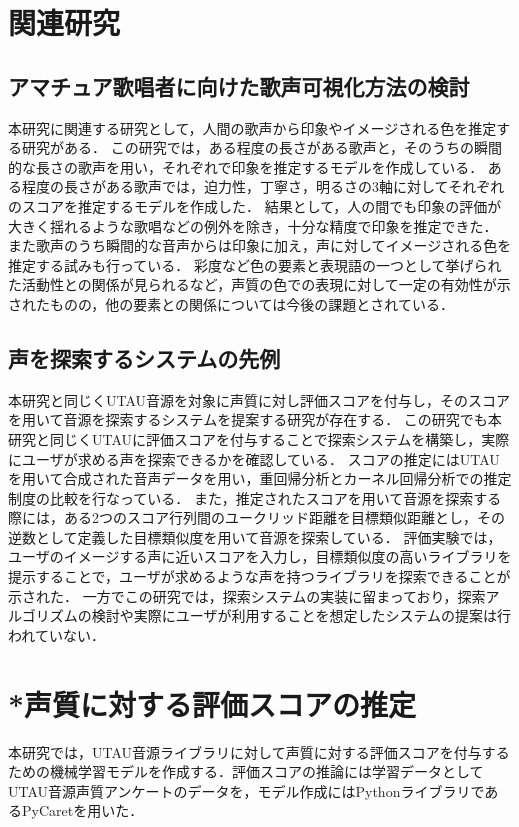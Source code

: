 \documentclass[a4j,8pt,twocolumn]{extarticle}
\begin{document}
\section{関連研究}
\subsection{アマチュア歌唱者に向けた歌声可視化方法の検討}
本研究に関連する研究として，人間の歌声から印象やイメージされる色を推定する研究\cite{}がある．
この研究では，ある程度の長さがある歌声と，そのうちの瞬間的な長さの歌声を用い，それぞれで印象を推定するモデルを作成している．
ある程度の長さがある歌声では，迫力性，丁寧さ，明るさの3軸に対してそれぞれのスコアを推定するモデルを作成した．
結果として，人の間でも印象の評価が大きく揺れるような歌唱などの例外を除き，十分な精度で印象を推定できた．
また歌声のうち瞬間的な音声からは印象に加え，声に対してイメージされる色を推定する試みも行っている．
彩度など色の要素と表現語の一つとして挙げられた活動性との関係が見られるなど，声質の色での表現に対して一定の有効性が示されたものの，他の要素との関係については今後の課題とされている．

\subsection{声を探索するシステムの先例}
本研究と同じくUTAU音源を対象に声質に対し評価スコアを付与し，そのスコアを用いて音源を探索するシステムを提案する研究\cite{}が存在する．
この研究でも本研究と同じくUTAUに評価スコアを付与することで探索システムを構築し，実際にユーザが求める声を探索できるかを確認している．
スコアの推定にはUTAUを用いて合成された音声データを用い，重回帰分析とカーネル回帰分析での推定制度の比較を行なっている．
また，推定されたスコアを用いて音源を探索する際には，ある2つのスコア行列間のユークリッド距離を目標類似距離とし，その逆数として定義した目標類似度を用いて音源を探索している．
評価実験では，ユーザのイメージする声に近いスコアを入力し，目標類似度の高いライブラリを提示することで，ユーザが求めるような声を持つライブラリを探索できることが示された．
一方でこの研究では，探索システムの実装に留まっており，探索アルゴリズムの検討や実際にユーザが利用することを想定したシステムの提案は行われていない．

\section{*声質に対する評価スコアの推定}
本研究では，UTAU音源ライブラリに対して声質に対する評価スコアを付与するための機械学習モデルを作成する．評価スコアの推論には学習データとしてUTAU音源声質アンケートのデータを，モデル作成にはPythonライブラリであるPyCaretを用いた．
\end{document}
